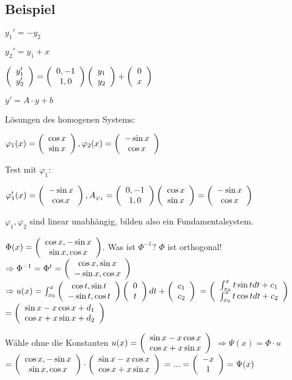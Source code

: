 \renewcommand{\ldate}{2015-12-17}

\subsection{Beispiel}
$y_1' = -y_2$

$y_2' = y_1 + x$

$\vektor{y_1'\\y_2'} = \vektor{0, -1\\1,0} \vektor{y_1\\y_2} + \vektor{0\\x}$

$y' = A\cdot y + b$

Lösungen des homogenen Systems: 

$ \varphi_1(x) = \vektor{\cos x \\ \sin x}, \varphi_2(x)=\vektor{-\sin x\\\cos x}$

Test mit $\varphi_1$:

$\varphi_1'(x) = \vektor{-\sin x\\\cos x}, A_{\varphi_1} = \vektor{0,-1\\1,0} \vektor{\cos x\\\sin x} = \vektor{-\sin x\\\cos x}$

$\varphi_1, \varphi_2$ sind linear unabhängig, bilden also ein Fundamentalsystem.

$\Phi(x) = \vektor{\cos x, -\sin x\\\sin x, \cos x}$. Was ist $\Phi^{-1}$? $\Phi$ ist orthogonal! 
$\Rightarrow \Phi^{-1} = \Phi^t = \vektor{\cos x, \sin x\\-\sin x, \cos x}$
$\Rightarrow u(x) = \int_{x_0}^{x} \vektor{\cos t, \sin t\\-\sin t, \cos t} \vektor{0\\t} dt + \vektor{c_1\\c_2}$
$=\vektor{\int_{x_0}^{x} t \sin t dt + c_1\\\int_{x_0}^{x} t \cos t dt + c_2}$
$=\vektor{\sin x - x \cos x + d_1\\\cos x + x \sin x + d_2}$ 

Wähle ohne die Konstanten $u(x) = \vektor{\sin x - x \cos x\\\cos x + x \sin x}$
$\Rightarrow \Psi(x) = \Phi \cdot u$
$=\vektor{\cos x, -\sin x\\\sin x, \cos x} \cdot \vektor{\sin x - x \cos x\\\cos x + x \sin x}$
$=...=\vektor{-x\\1} = \Psi(x)$\\

